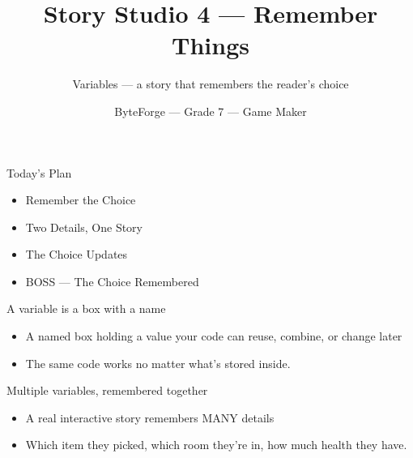 \documentclass[aspectratio=169]{beamer}
\title{Story Studio 4 — Remember Things}
\subtitle{Variables — a story that remembers the reader's choice}
\author{ByteForge --- Grade 7 --- Game Maker}
\date{}
\begin{document}
\begin{frame}
    \titlepage
\end{frame}

\begin{frame}{Today's Plan}
    \begin{itemize}
        \item Remember the Choice
        \item Two Details, One Story
        \item The Choice Updates
        \item[$\bigstar$] BOSS --- The Choice Remembered
    \end{itemize}
\end{frame}

\begin{frame}{A variable is a box with a name}
    \large
    \begin{itemize}
        \item A named box holding a value your code can reuse, combine, or change later
        \item The same code works no matter what's stored inside.
    \end{itemize}

    \begin{center}
    \end{center}
\end{frame}


\begin{frame}{Multiple variables, remembered together}
    \large
    \begin{itemize}
        \item A real interactive story remembers MANY details
        \item Which item they picked, which room they're in, how much health they have.
    \end{itemize}
\end{frame}
\end{document}
